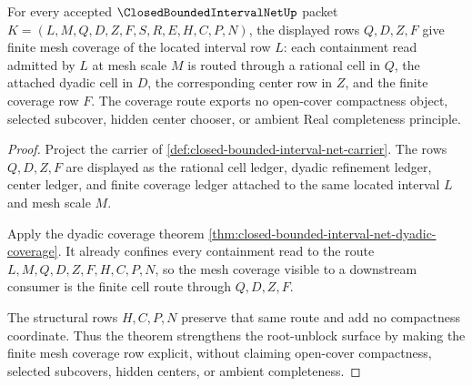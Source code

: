 \begin{theorem}
\label{thm:closed-bounded-interval-net-finite-mesh-coverage}
For every accepted $\ClosedBoundedIntervalNetUp$ packet $K=(L,M,Q,D,Z,F,S,R,E,H,C,P,N)$, the displayed rows $Q,D,Z,F$ give finite mesh coverage of the located interval row $L$: each containment read admitted by $L$ at mesh scale $M$ is routed through a rational cell in $Q$, the attached dyadic cell in $D$, the corresponding center row in $Z$, and the finite coverage row $F$. The coverage route exports no open-cover compactness object, selected subcover, hidden center chooser, or ambient Real completeness principle.
\end{theorem}
\begin{proof}
Project the carrier of \autoref{def:closed-bounded-interval-net-carrier}. The rows $Q,D,Z,F$ are displayed as the rational cell ledger, dyadic refinement ledger, center ledger, and finite coverage ledger attached to the same located interval $L$ and mesh scale $M$.

Apply the dyadic coverage theorem \autoref{thm:closed-bounded-interval-net-dyadic-coverage}. It already confines every containment read to the route $L,M,Q,D,Z,F,H,C,P,N$, so the mesh coverage visible to a downstream consumer is the finite cell route through $Q,D,Z,F$.

The structural rows $H,C,P,N$ preserve that same route and add no compactness coordinate. Thus the theorem strengthens the root-unblock surface by making the finite mesh coverage row explicit, without claiming open-cover compactness, selected subcovers, hidden centers, or ambient completeness.
\end{proof}

